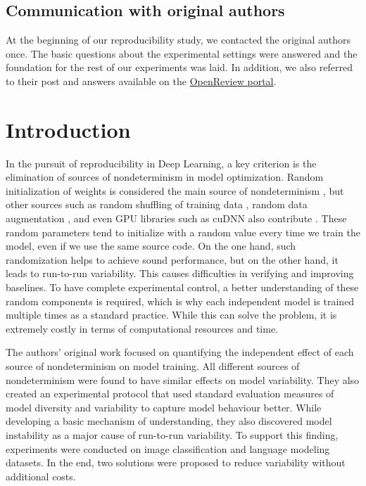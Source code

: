 \subsection*{Communication with original authors}

At the beginning of our reproducibility study, we contacted the original authors once. The basic questions about the experimental settings were answered and the foundation for the rest of our experiments was laid. In addition, we also referred to their post and answers available on the \href{https://openreview.net/forum?id=SQ7EHTDyn9Y}{OpenReview portal}.

\newpage

\section{Introduction}
\label{sec:Introduction}
In the pursuit of reproducibility in Deep Learning, a key criterion is the elimination of sources of nondeterminism in model optimization. Random initialization of weights is considered the main source of nondeterminism \citep{zhuang2021randomness}, but other sources such as random shuffling of training data \cite{hartley2020dtoolai}, random data augmentation \citep{renard2020variability}, and even GPU libraries such as cuDNN also contribute \citep{heumos2021mlf} . These random parameters tend to initialize with a random value every time we train the model, even if we use the same source code. On the one hand, such randomization helps to achieve sound performance, but on the other hand, it leads to run-to-run variability. This causes difficulties in verifying and improving baselines. To have complete experimental control, a better understanding of these random components is required, which is why each independent model is trained multiple times as a standard practice. While this can solve the problem, it is extremely costly in terms of computational resources and time.

The authors' original work focused on quantifying the independent effect of each source of nondeterminism on model training. All different sources of nondeterminism were found to have similar effects on model variability. They also created an experimental protocol that used standard evaluation measures of model diversity and variability to capture model behaviour better. While developing a basic mechanism of understanding, they also discovered model instability as a major cause of run-to-run variability. To support this finding, experiments were conducted on image classification and language modeling datasets. In the end, two solutions were proposed to reduce variability without additional costs.

